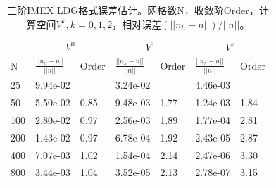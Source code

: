 \begin{table}
    \begin{tabularx}{\textwidth}{@{} *7{X} @{}}
        \toprule
            & \multicolumn{2}{c}{$V^0$} & \multicolumn{2}{c}{$V^1$} & \multicolumn{2}{c}{$V^2$}                                                     \\
        \cmidrule(lr){2-3} \cmidrule(lr){4-5} \cmidrule(lr){6-7}
        N   & $\frac{||n_h-n||}{||n||}$ & Order                     & $\frac{||n_h-n||}{||n||}$ & Order     & $\frac{||n_h-n||}{||n||}$ & Order     \\
        \midrule
        25  & 9.94e-02                  & \text{——}                 & 3.24e-02                  & \text{——} & 4.46e-03                  & \text{——} \\
        50  & 5.50e-02                  & 0.85                      & 9.48e-03                  & 1.77      & 1.24e-03                  & 1.84      \\
        100 & 2.80e-02                  & 0.97                      & 2.56e-03                  & 1.89      & 1.77e-04                  & 2.81      \\
        200 & 1.43e-02                  & 0.97                      & 6.78e-04                  & 1.92      & 2.43e-05                  & 2.87      \\
        400 & 7.07e-03                  & 1.02                      & 1.54e-04                  & 2.14      & 2.47e-06                  & 3.30      \\
        800 & 3.44e-03                  & 1.04                      & 3.52e-05                  & 2.13      & 2.78e-07                  & 3.15      \\
        \bottomrule
    \end{tabularx}
    \caption{三阶IMEX LDG格式误差估计。网格数N，收敛阶Order，计算空间$V^k, k=0,1,2$，相对误差$(||n_h-n||)/||n||$。}
    \label{tab:IMEXLDGerror:3}
\end{table}

